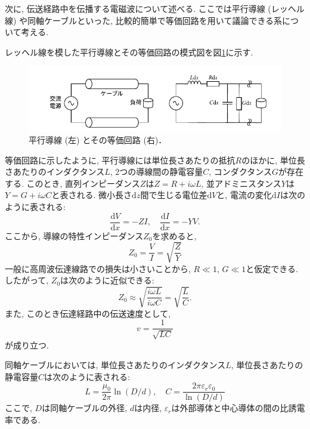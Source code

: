 \documentclass[uplatex,dvipdfmx,a4j,12pt]{jsarticle}
\newcommand{\diff}{\mathrm{d}} %
\begin{document}
\enskip

次に, 伝送経路中を伝播する電磁波について述べる.
ここでは平行導線 (レッヘル線) や同軸ケーブルといった, 比較的簡単で等価回路を用いて議論できる系について考える.

レッヘル線を模した平行導線とその等価回路の模式図を図\ref{fig:lecher_line}に示す.
\begin{figure}[h]
    \centering
    \includegraphics[width=0.9\linewidth]{img/lecher_line.pdf}
    \caption{平行導線 (左) とその等価回路 (右)．}
    \label{fig:lecher_line}
\end{figure}

等価回路に示したように, 平行導線には単位長さあたりの抵抗$R$のほかに, 単位長さあたりのインダクタンス$L$, 
2つの導線間の静電容量$C$, コンダクタンス$G$が存在する.
このとき, 直列インピーダンス$Z$は$Z = R + i\omega L$, 並アドミニスタンス$Y$は$Y = G + i\omega C$と表される.
微小長さ$\diff z$間で生じる電位差$\diff V$と, 電流の変化$\diff I$は次のように表される:
\begin{equation}
  \frac{\diff V}{\diff x} = - Z I, \quad \frac{\diff I}{\diff x} = - Y V.
\end{equation}
ここから, 導線の特性インピーダンス$Z_0$を求めると,
\begin{equation}
  Z_0 = \frac{V}{I} = \sqrt{\frac{Z}{Y}} 
\end{equation}
一般に高周波伝達線路での損失は小さいことから, $R \ll 1$, $G \ll 1$と仮定できる.
したがって, $Z_0$は次のように近似できる:
\begin{equation}
  Z_0 \approx \sqrt{\frac{i\omega L}{i\omega C}} = \sqrt{\frac{L}{C}}.
\end{equation}
また, このとき伝達経路中の伝送速度として,
\begin{equation}
  v = \frac{1}{\sqrt{LC}}
\end{equation}
が成り立つ.

\enskip

同軸ケーブルにおいては, 単位長さあたりのインダクタンス$L$, 単位長さあたりの静電容量$C$は次のように表される:
\begin{equation}
  L = \frac{\mu_0}{2\pi} \ln\left(D/d\right), \quad C = \frac{2\pi\varepsilon_r \varepsilon_0}{\ln\left(D/d\right) }
\end{equation}
ここで, $D$は同軸ケーブルの外径, $d$は内径, $\varepsilon_r$は外部導体と中心導体の間の比誘電率である.
\end{document}
